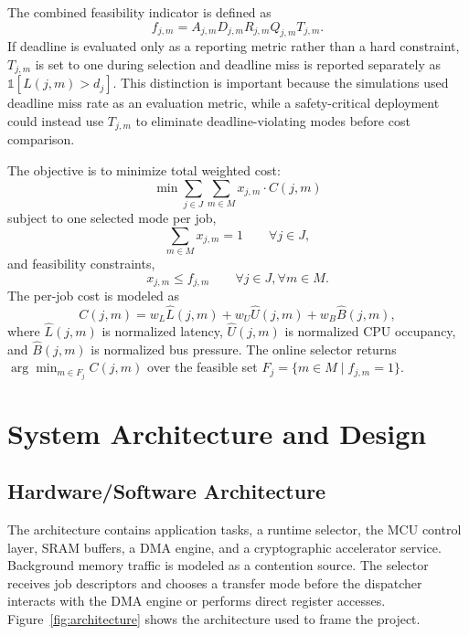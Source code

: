 \documentclass[conference]{IEEEtran}
\begin{document}
The combined feasibility indicator is defined as
\begin{equation}
f_{j,m} = A_{j,m} D_{j,m} R_{j,m} Q_{j,m} T_{j,m}.
\label{eq:feasibility_indicator}
\end{equation}
If deadline is evaluated only as a reporting metric rather than a hard constraint, $T_{j,m}$ is set to one during selection and deadline miss is reported separately as $\mathbb{1}[L(j,m)>d_j]$. This distinction is important because the simulations used deadline miss rate as an evaluation metric, while a safety-critical deployment could instead use $T_{j,m}$ to eliminate deadline-violating modes before cost comparison.

The objective is to minimize total weighted cost:
\begin{equation}
\min \sum_{j \in J} \sum_{m \in M} x_{j,m} \cdot C(j,m)
\label{eq:objective}
\end{equation}
subject to one selected mode per job,
\begin{equation}
\sum_{m \in M} x_{j,m} = 1 \qquad \forall j \in J,
\label{eq:one_mode}
\end{equation}
and feasibility constraints,
\begin{equation}
x_{j,m} \leq f_{j,m} \qquad \forall j \in J, \forall m \in M.
\label{eq:feasible}
\end{equation}
The per-job cost is modeled as
\begin{equation}
C(j,m) = w_L \hat{L}(j,m) + w_U \hat{U}(j,m) + w_B \hat{B}(j,m),
\label{eq:cost}
\end{equation}
where $\hat{L}(j,m)$ is normalized latency, $\hat{U}(j,m)$ is normalized CPU occupancy, and $\hat{B}(j,m)$ is normalized bus pressure. The online selector returns $\arg\min_{m \in F_j} C(j,m)$ over the feasible set $F_j = \{m \in M \mid f_{j,m}=1\}$.

\section{System Architecture and Design}
\subsection{Hardware/Software Architecture}
The architecture contains application tasks, a runtime selector, the MCU control layer, SRAM buffers, a DMA engine, and a cryptographic accelerator service. Background memory traffic is modeled as a contention source. The selector receives job descriptors and chooses a transfer mode before the dispatcher interacts with the DMA engine or performs direct register accesses. Figure~\ref{fig:architecture} shows the architecture used to frame the project.
\end{document}
